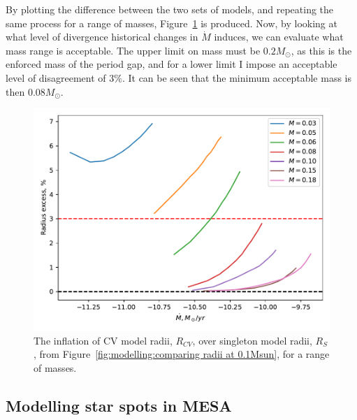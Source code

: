 By plotting the difference between the two sets of models, and repeating the same process for a range of masses, Figure~\ref{fig:modelling:comparing radii over a range of masses} is produced. Now, by looking at what level of divergence historical changes in $\dot M$ induces, we can evaluate what mass range is acceptable. The upper limit on mass must be $0.2 M_\odot$, as this is the enforced mass of the period gap, and for a lower limit I impose an acceptable level of disagreement of $3\%$. It can be seen that the minimum acceptable mass is then $0.08 M_\odot$.
\begin{figure}
    \centering
    \includegraphics[width=\textwidth]{figures/modelling/compare_multiple_mass_with_CV_K11_fig1a.pdf}
    \caption{The inflation of CV model radii, $R_{CV}$, over singleton model radii, $R_S$, from Figure~\ref{fig:modelling:comparing radii at 0.1Msun}, for a range of masses.}
    \label{fig:modelling:comparing radii over a range of masses}
\end{figure}


\subsection{Modelling star spots in MESA}\label{sect:modelling:starspots in MESA}

